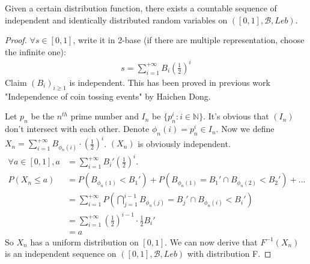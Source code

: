 \documentclass[a4paper, linespread=1.5]{article}
\begin{document}
    \begin{customthm}{1}
        Given a certain distribution function, there exists a countable sequence of independent and identically distributed random variables on $([0,1],\mathcal{B},Leb)$.
    \end{customthm}
    \begin{proof}
        $\forall s\in [0,1]$, write it in 2-base (if there are multiple representation, choose the infinite one):
        \begin{align}
            s=\sum\limits_{i=1}^{+\infty}B_{i}(\frac{1}{2})^i
        \end{align}
        Claim $({B_i})_{i\ge 1}$ is independent.
        This has been proved in previous work "Independence of coin tossing events" by Haichen Dong.

        Let $p_n$ be the $n^{th}$ prime number and $I_n$ be $\{p_n^i:i\in\mathbb{N}\}$.
        It's obvious that $(I_n)$ don't intersect with each other.
        Denote $\phi_n(i)=p_n^i\in I_n$.
        Now we define $X_n=\sum\limits_{i=1}^{+\infty}B_{\phi_n(i)}\cdot(\frac{1}{2})^i$.
        $(X_n)$ is obviously independent.
        \begin{align*}
            \forall a\in [0,1] ,a&=\sum\limits_{i=1}^{+\infty}B_{i}'(\frac{1}{2})^i.\\
            P(X_n\le a)&=P(B_{\phi_n(1)}<B_{1}')+P(B_{\phi_n(1)}=B_{1}'\cap B_{\phi_n(2)}<B_{2}')+...\\
            &=\sum\limits_{i=1}^{+\infty}P(\bigcap\limits_{j=1}^{i-1}B_{\phi_n(j)}=B_{j}' \cap B_{\phi_n(i)}<B_{i}')\\
            &=\sum\limits_{i=1}^{+\infty}(\frac{1}{2})^{i-1}\cdot\frac{1}{2}B_{i}'\\
            &=a
        \end{align*}
        So $X_n$ has a uniform distribution on $[0,1]$.
        We can now derive that $F^{-1}(X_n)$ is an independent sequence on $([0,1],\mathcal{B},Leb)$ with distribution F.
    \end{proof}
\end{document}
